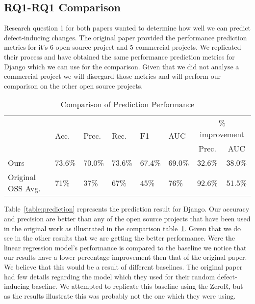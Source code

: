 \documentclass[10pt, conference]{IEEEtran}
\begin{document}
\subsection{RQ1-RQ1 Comparison}
\label{sec:comp-rq11}

Research question 1 for both papers wanted to determine how well we can predict defect-inducing changes. The original paper provided the performance prediction metrics for it's 6 open source project and 5 commercial projects. We replicated their process and have obtained the same performance prediction metrics for Django which we can use for the comparison. Given that we did not analyse a commercial project we will disregard those metrics and will perform our comparison on the other open source projects.

\begin{table}
	\centering
	\caption{Comparison of Prediction Performance}
	\begin{tabular}{|p{1cm}|p{0.5cm}|p{0.5cm}|p{0.5cm}|p{0.5cm}|p{0.5cm}||c|c|}
		\hline & \multirow{2}{*}{Acc.} & \multirow{2}{*}{Prec.} & \multirow{2}{*}{Rec.} & \multirow{2}{*}{F1} & \multirow{2}{*}{AUC} & \multicolumn{2}{|c|}{\% improvement} \\ \cline{7-8} 
		 & &  &  &  &  & Prec. & AUC \\  
		\hline Ours & 73.6\% & 70.0\% & 73.6\% & 67.4\% & 69.0\% & 32.6\% & 38.0\% \\ 
		\hline Original OSS Avg. & 71\% & 37\% & 67\% & 45\% & 76\% & 92.6\% & 51.5\% \\ 
		\hline 
	\end{tabular}
	
	\label{table:compare_prediction} 
\end{table}

Table~\ref{table:prediction} represents the prediction result for Django. Our accuracy and precision are better than any of the open source projects that have been used in the original work as illustrated in the comparison table~\ref{table:compare_prediction}. Given that we do see in the other results that we are getting the better performance. Were the linear regression model's performance is compared to the baseline we notice that our results have a lower percentage improvement then that of the original paper. We believe that this would be a result of different baselines. The original paper had few details regarding the model which they used for their random defect-inducing baseline. We attempted to replicate this baseline using the ZeroR, but as the results illustrate this was probably not the one which they were using. 
   
\end{document}
